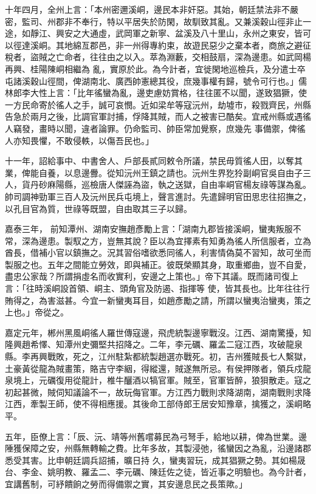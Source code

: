 \begin{pinyinscope}
 十年四月，全州上言：「本州密邇溪峒，邊民本非奸惡。其始，朝廷禁法非不嚴密，監司、州郡非不奉行，特以平居失於防閑，故馴致其亂。又兼溪穀山徑非止一途，如靜江、興安之大通虛，武岡軍之新寧、盆溪及八十里山，永州之東安，皆可以徑達溪峒。其地綿亙郡邑，非一州得專約束，故遊民惡少之棄本者，商旅之避征稅者，盜賊之亡命者，往往由之以入。萃為淵藪，交相鼓扇，深為邊患。如武岡楊再興、桂陽陳峒相繼為
 亂，實原於此。為今計者，宜徙閑地巡檢兵，及分遣士卒屯諸溪穀山徑間，俾湖南北、廣西帥憲總其役，庶幾事權有歸，號令可行也。」儒林郎李大性上言：「比年徭蠻為亂，邊吏慮妨賞格，往往匿不以聞，遂致猖獗，使一方民命寄於徭人之手，誠可哀憫。近如梁牟等寇沅州，劫墟市，殺戮齊民，州縣告急於兩月之後，比調官軍討捕，俘降其賊，而人之被害已酷矣。宜戒州縣或遇徭人竊發，畫時以聞，違者論罪。仍命監司、帥臣常加覺察，庶幾先
 事備禦，俾徭人亦知畏懼，不敢侵軼，以傷吾民也。」



 十一年，詔給事中、中書舍人、戶部長貳同敕令所議，禁民毋質徭人田，以奪其業，俾能自養，以息邊釁。從知沅州王鎮之請也。沅州生界犵狑副峒官吳自由子三人，貨丹砂麻陽縣，巡檢唐人傑誣為盜，執之送獄，自由率峒官楊友祿等謀為亂。帥司調神勁軍三百人及沅州民兵屯境上，聲言進討。先遣歸明官田思忠往招撫之，以孔目官為質，世祿等既盟，自由取其三子以歸。



 嘉泰三年，
 前知潭州、湖南安撫趙彥勵上言：「湖南九郡皆接溪峒，蠻夷叛服不常，深為邊患。製馭之方，豈無其說？臣以為宜擇素有知勇為徭人所信服者，立為酋長，借補小官以鎮撫之。況其習俗嗜欲悉同徭人，利害情偽莫不習知，故可坐而製服之也。五年之間能立勞效，即與補正。彼既榮顯其身，取重鄉曲，豈不自愛，盡忠公家哉？所謂捐虛名而收實利，安邊之上策也。」帝下其議。既而諸司復上言：「往時溪峒設首領、峒主、頭角官及防遏、指揮等
 使，皆其長也。比年往往行賄得之，為害滋甚。今宜一新蠻夷耳目，如趙彥勵之請，所謂以蠻夷治蠻夷，策之上也。」帝從之。



 嘉定元年，郴州黑風峒徭人羅世傳寇邊，飛虎統製邊寧戰沒。江西、湖南驚擾，知隆興趙希懌、知潭州史彌堅共招降之。二年，李元礪、羅孟二寇江西，攻破龍泉縣。李再興戰敗，死之，江州駐紮都統製趙選亦戰死。初，吉州獲賊長七人繫獄，土豪黃從龍為賊畫策，賂吉守李絪，得縱還，賊遂無所忌。有侯押隊者，領兵戍龍
 泉境上，元礪復用從龍計，椎牛釃酒以犒官軍。賊至，官軍皆醉，狼狽散走。寇之初起甚微，賊伺知議論不一，故玩侮官軍。方江西力戰則求降湖南，湖南戰則求降江西，牽製王師，使不得相應援。其後命工部侍郎王居安知豫章，擒獲之，溪峒略平。



 五年，臣僚上言：「辰、沅、靖等州舊嚐募民為弓弩手，給地以耕，俾為世業。邊陲獲保障之安，州縣無轉輸之費。比年多故，其製浸弛，徭蠻因之為亂，沿邊諸郡悉受其害。比申朝廷調兵詔捕，曠日持
 久，蠻夷習玩，成其猖獗之勢。其如楊晟台、李金、姚明教、羅孟二、李元礪、陳廷佐之徒，皆近事之明驗也。為今計者，宜講舊制，可紓饋餉之勞而得備禦之實，其安邊息民之長策歟。」




\end{pinyinscope}
